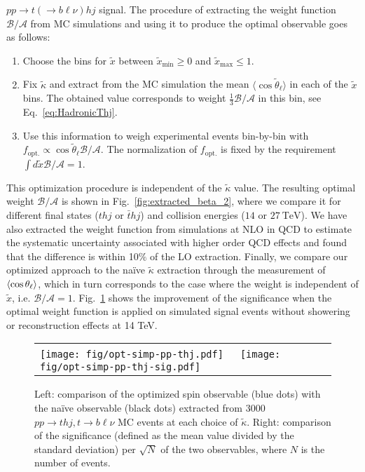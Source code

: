 \documentclass[11pt,a4paper]{article}
\newcommand {\e}[1]{\mathrm{~#1}}
\newcommand{\mc}[1]{\mathcal{#1}}
\newcommand{\mrm}[1]{\mathrm{#1}}
\begin{document}
$p p \to t (\to b \ell \nu) h j$ signal. The procedure of extracting the weight function $\mc{B}/\mc{A}$ from MC
simulations and using it to produce the optimal observable goes as
follows:
\begin{enumerate}
	\item Choose the bins for $\tilde{x}$ between $\tilde x_\mrm{min} \ge 0$ and $\tilde x_\mrm{max} \le 1$.
	\item Fix $\tilde{\kappa}$ and extract from the MC simulation the mean $\langle\cos\tilde{\theta}_\ell\rangle$ in each of the $\tilde x$ bins. The obtained value corresponds to weight $\frac{1}{3}\mc{B}/\mc{A}$ in this bin, see Eq.~\eqref{eq:HadronicThj}.
	\item Use this information to weigh experimental events bin-by-bin with $f_\mrm{opt.} \propto \cos\tilde\theta_\ell \mc{B}/ \mc{A}$. The normalization of $f_\mrm{opt.}$ is fixed by the requirement $\int d\tilde x \mc{B}/ \mc{A} = 1$.         
\end{enumerate}
This optimization procedure is independent of the $\tilde \kappa$ value. The resulting optimal weight $\mc{B}/\mc{A}$ is shown in Fig.~\ref{fig:extracted_beta_2}, where we compare it for different final states ($t h j$ or $\bar t h j$) and collision energies ($14$ or $27\e{TeV}$). We have also extracted the weight function from simulations at NLO in QCD to estimate the systematic uncertainty associated with higher order QCD effects and found that the difference is within 10$\%$ of the LO extraction. Finally, we compare our optimized approach to the na\"ive $\tilde \kappa$ extraction through the measurement of $\Braket{\cos \theta_\ell}$, which in turn corresponds to the case where the weight is independent of $\tilde x$, i.e. $\mc{B}/\mc{A} = 1$.
Fig.~\ref{fig:pp-thj-kptld} shows the improvement of the significance when the optimal weight function is applied on simulated signal events without showering or reconstruction effects at 14 TeV.


\begin{figure}[!h]
  \centering
  \begin{tabular}{lr}
    \texttt{[image: fig/opt-simp-pp-thj.pdf]}\ \  \ \texttt{[image: fig/opt-simp-pp-thj-sig.pdf]}
  \end{tabular}
	
	\caption{Left: comparison of the optimized spin observable (blue dots) with the na\"ive observable (black dots) extracted from $3000$ $p p \to t h j, t \to b \ell \nu$ MC events at each choice of $\tilde \kappa$. Right: comparison of the significance (defined as the mean value divided by the standard deviation) per $\sqrt{N}$ of the two observables, where $N$ is the number of events.}
	\label{fig:pp-thj-kptld}
\end{figure}
\end{document}

